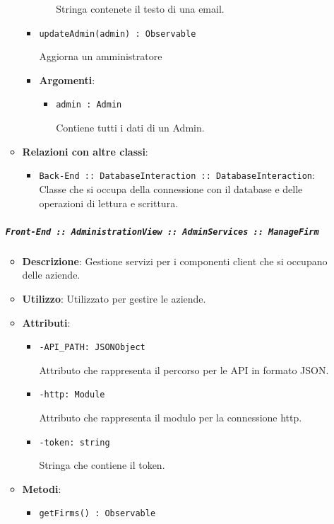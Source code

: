 \documentclass[../DefinizioneDiProdotto.tex]{subfiles}
\begin{document}
\begin{itemize}
\begin{itemize}
\begin{itemize}
\begin{itemize}
	 Stringa contenete il testo di una email.
	\end{itemize}
	\end{itemize}\vspace{0.5em}
	\begin{itemize}
	\item \texttt{updateAdmin(admin) : Observable}\

	 Aggiorna un amministratore

	\item \textbf{Argomenti}:
	\begin{itemize}
	\item \texttt{admin : Admin}\

	 Contiene tutti i dati di un Admin.
	\end{itemize}
	\end{itemize}\vspace{0.5em}
	\item \textbf{Relazioni con altre classi}:
	\begin{itemize}
	\item \texttt{Back-End :: DatabaseInteraction :: DatabaseInteraction}: Classe che si occupa della connessione con il database e delle operazioni di lettura e scrittura.
	\end{itemize}
	\end{itemize}\subparagraph{\texttt{Front-End :: AdministrationView :: AdminServices :: ManageFirm}}
	\begin{itemize}\item \textbf{Descrizione}: Gestione servizi per i componenti client che si occupano delle aziende.
	\item \textbf{Utilizzo}: Utilizzato per gestire le aziende.
	\item \textbf{Attributi}:
	\begin{itemize}
	\item \texttt{-API\_PATH: JSONObject}\

	 Attributo che rappresenta il percorso per le API in formato JSON.
	\end{itemize}
	\begin{itemize}
	\item \texttt{-http: Module}\

	 Attributo che rappresenta il modulo per la connessione http.
	\end{itemize}
	\begin{itemize}
	\item \texttt{-token: string}\

	 Stringa che contiene il token.
	\end{itemize}
	\item \textbf{Metodi}:
	\begin{itemize}
	\item \texttt{getFirms() : Observable}\


\end{itemize}
\end{itemize}
\end{itemize}
\end{document}
